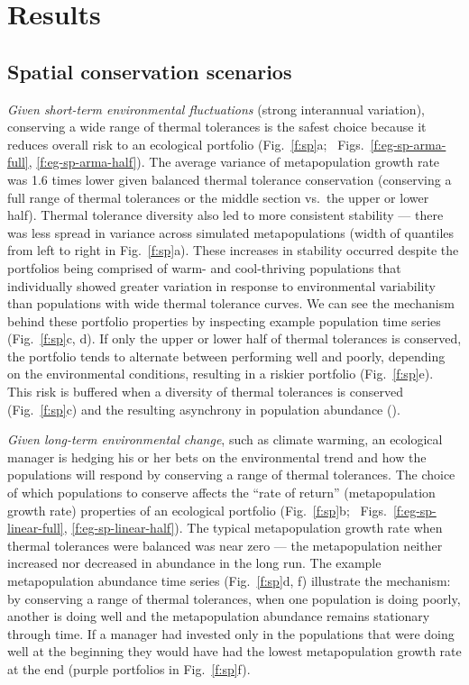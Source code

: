 \section{Results}

\subsection{Spatial conservation scenarios}\label{spatial-conservation-scenarios}

\emph{Given short-term environmental fluctuations} (strong interannual variation), conserving a wide range of thermal tolerances is the safest choice because it reduces overall risk to an ecological portfolio (Fig.~\ref{f:sp}a; \somts~Figs.~\ref{f:eg-sp-arma-full}, \ref{f:eg-sp-arma-half}). The average variance of metapopulation growth rate was 1.6 times lower given balanced thermal tolerance conservation (conserving a full range of thermal tolerances or the middle section vs.~the upper or lower half). Thermal tolerance diversity also led to more consistent stability --- there was less spread in variance across simulated metapopulations (width of quantiles from left to right in Fig.~\ref{f:sp}a). These increases in stability occurred despite the portfolios being comprised of warm- and cool-thriving populations that individually showed greater variation in response to environmental variability than populations with wide thermal tolerance curves. We can see the mechanism behind these portfolio properties by inspecting example population time series (Fig.~\ref{f:sp}c, d). If only the upper or lower half of thermal tolerances is conserved, the portfolio tends to alternate between performing well and poorly, depending on the environmental conditions, resulting in a riskier portfolio (Fig.~\ref{f:sp}e). This risk is buffered when a diversity of thermal tolerances is conserved (Fig.~\ref{f:sp}c) and the resulting asynchrony in population abundance (\somcor).

\emph{Given long-term environmental change}, such as climate warming, an ecological manager is hedging his or her bets on the environmental trend and how the populations will respond by conserving a range of thermal tolerances. The choice of which populations to conserve affects the ``rate of return'' (metapopulation growth rate) properties of an ecological portfolio (Fig.~\ref{f:sp}b; \somts~Figs.~\ref{f:eg-sp-linear-full}, \ref{f:eg-sp-linear-half}). The typical metapopulation growth rate when thermal tolerances were balanced was near zero --- the metapopulation neither increased nor decreased in abundance in the long run. The example metapopulation abundance time series (Fig.~\ref{f:sp}d, f) illustrate the mechanism: by conserving a range of thermal tolerances, when one population is doing poorly, another is doing well and the metapopulation abundance remains stationary through time. If a manager had invested only in the populations that were doing well at the beginning they would have had the lowest metapopulation growth rate at the end (purple portfolios in Fig.~\ref{f:sp}f).

